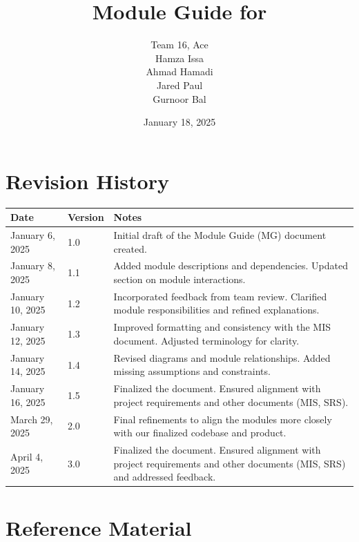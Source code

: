 \documentclass[12pt, titlepage]{article}
\begin{document}
\title{Module Guide for \progname} 
\author{Team 16, Ace\\
Hamza Issa \\
Ahmad Hamadi \\
Jared Paul \\
Gurnoor Bal}
\date{January 18, 2025}

\maketitle


\section{Revision History}

\begin{tabularx}{\textwidth}{p{3cm}p{2cm}X}
\toprule
{\bf Date} & {\bf Version} & {\bf Notes}\\
\midrule
January 6, 2025 & 1.0 & Initial draft of the Module Guide (MG) document created.\\
January 8, 2025 & 1.1 & Added module descriptions and dependencies. Updated section on module interactions.\\
January 10, 2025 & 1.2 & Incorporated feedback from team review. Clarified module responsibilities and refined explanations.\\
January 12, 2025 & 1.3 & Improved formatting and consistency with the MIS document. Adjusted terminology for clarity.\\
January 14, 2025 & 1.4 & Revised diagrams and module relationships. Added missing assumptions and constraints.\\
January 16, 2025 & 1.5 & Finalized the document. Ensured alignment with project requirements and other documents (MIS, SRS).\\
March 29, 2025 & 2.0 & Final refinements to align the modules more closely with our finalized codebase and product.\\
April 4, 2025 & 3.0 & Finalized the document. Ensured alignment with project requirements and other documents (MIS, SRS) and addressed feedback.\\
\bottomrule
\end{tabularx}

\newpage

\section{Reference Material}
\end{document}
